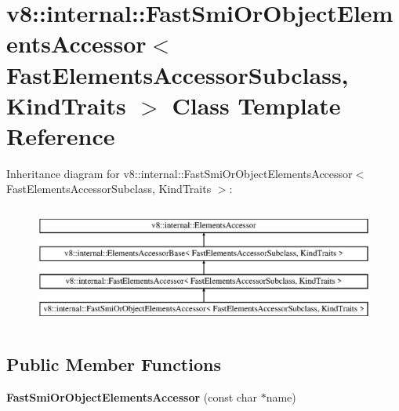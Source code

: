 \hypertarget{classv8_1_1internal_1_1_fast_smi_or_object_elements_accessor}{}\section{v8\+:\+:internal\+:\+:Fast\+Smi\+Or\+Object\+Elements\+Accessor$<$ Fast\+Elements\+Accessor\+Subclass, Kind\+Traits $>$ Class Template Reference}
\label{classv8_1_1internal_1_1_fast_smi_or_object_elements_accessor}
Inheritance diagram for v8\+:\+:internal\+:\+:Fast\+Smi\+Or\+Object\+Elements\+Accessor$<$ Fast\+Elements\+Accessor\+Subclass, Kind\+Traits $>$\+:\begin{figure}[H]
\begin{center}
\leavevmode
\includegraphics[height=4.000000cm]{classv8_1_1internal_1_1_fast_smi_or_object_elements_accessor}
\end{center}
\end{figure}
\subsection*{Public Member Functions}
\begin{DoxyCompactItemize}
\item 
\hypertarget{classv8_1_1internal_1_1_fast_smi_or_object_elements_accessor_a6cf8f5f9bb6262f5e63928e720adc84e}{}{\bfseries Fast\+Smi\+Or\+Object\+Elements\+Accessor} (const char $\ast$name)\label{classv8_1_1internal_1_1_fast_smi_or_object_elements_accessor_a6cf8f5f9bb6262f5e63928e720adc84e}

\end{DoxyCompactItemize}
